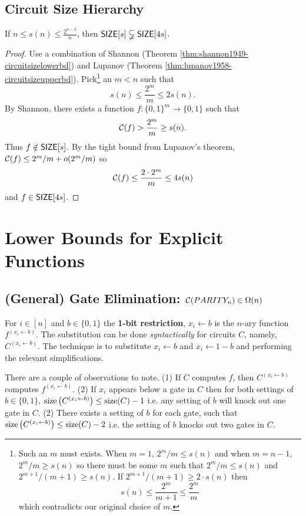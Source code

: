 \documentclass[11pt]{article}
\begin{document}
	\subsection{Circuit Size Hierarchy}
	\begin{theorem}
		\label{thm:circuitsizehierarchy}
		If $n \leq s(n) \leq \frac{2^{n-2}}{n}$, then $\mathsf{SIZE}[s] \subsetneqq \mathsf{SIZE}[4s]$.
	\end{theorem}
	\begin{proof}
		Use a combination of Shannon (Theorem \ref{thm:shannon1949-circuitsizelowerbd}) and Lupanov (Theorem \ref{thm:lupanov1958-circuitsizeupperbd}). Pick\footnote{Such an $m$ must exists. When $m = 1$, $2^{m}/m \leq s(n)$ and when $m = n-1$, $2^m/m \geq s(n)$ so there must be some $m$ such that $2^{m}/m \leq s(n)$ and $2^{m+1}/(m+1) \geq s(n)$. If $2^{m+1}/(m+1) \geq 2\cdot s(n)$ then 
			\[s(n) \leq \frac{2^{m}}{m+1} \leq \frac{2^{m}}{m}\]	
			which contradicts our original choice of $m$.} 
		an $m < n$ such that
		\[s(n) \leq \frac{2^m}{m} \leq 2s(n).\]
		By Shannon, there exists a function $f: \{0, 1\}^m \rightarrow \{0,1\}$ such that 
		\[\mathcal{C}(f) > \frac{2^m}{m} \geq s(n).\]
		Thus $f \notin \mathsf{SIZE}[s]$. By the tight bound from Lupanov's theorem, $\mathcal{C}(f) \leq 2^m/m + o(2^m/m)$ so 
		\[\mathcal{C}(f) \leq \frac{2\cdot 2^m}{m} \leq 4s(n)\]
		and $f \in \mathsf{SIZE}[4s]$. 
	\end{proof}
	
\section{Lower Bounds for Explicit Functions}
	\subsection{(General) Gate Elimination: \texorpdfstring{$\mathcal{C}(PARITY_n) \in \Omega(n)$}{C(PARITYn) in Omega(n)}}
	\begin{definition}
		For $i \in [n]$ and $b \in \{0,1\}$ the \textbf{1-bit restriction}, $x_i \leftarrow b$ is the $n$-ary function $f^{(x_i \leftarrow b)}$. The substitution can be done \emph{syntactically} for circuits $C$, namely, $C^{(x_i \leftarrow b)}$. The technique is to substitute $x_i \leftarrow b$ and $\overline{x}_i \leftarrow 1 - b$ and performing the relevant simplifications.
	\end{definition}
	
	There are a couple of observations to note. (1) If $C$ computes $f$, then $C^{(x_i \leftarrow b)}$ computes $f^{(x_i \leftarrow b)}$. (2) If $x_i$ appears below a gate in $C$ then for both settings of $b \in \{0,1\}$, $\operatorname*{size}\left(C^{(x_i \leftarrow b)}\right) \leq \operatorname*{size}(C) - 1$ i.e. any setting of $b$ will knock out one gate in $C$. (2) There exists a setting of $b$ for each gate, such that $\operatorname*{size}\left(C^{(x_i \leftarrow b)}\right) \leq \operatorname*{size}(C) - 2$ i.e. the setting of $b$ knocks out two gates in $C$.
	
\end{document}

